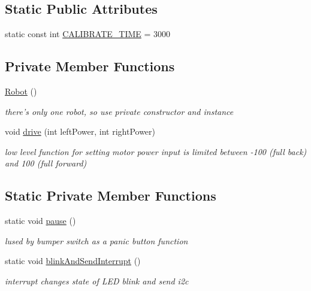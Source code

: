 \subsection*{Static Public Attributes}
\begin{DoxyCompactItemize}
\item 
static const int \hyperlink{classRobot_ac40abfa06749a68604af90c00e2a3fee}{C\-A\-L\-I\-B\-R\-A\-T\-E\-\_\-\-T\-I\-M\-E} = 3000
\end{DoxyCompactItemize}
\subsection*{Private Member Functions}
\begin{DoxyCompactItemize}
\item 
\hyperlink{classRobot_a4fc7c70ae20623f05e06f2ecb388b6c4}{Robot} ()
\begin{DoxyCompactList}\small\item\em there's only one robot, so use private constructor and instance \end{DoxyCompactList}\item 
void \hyperlink{classRobot_aad8723ec56e9fc8ca17da5ef79de37d6}{drive} (int left\-Power, int right\-Power)
\begin{DoxyCompactList}\small\item\em low level function for setting motor power input is limited between -\/100 (full back) and 100 (full forward) \end{DoxyCompactList}\end{DoxyCompactItemize}
\subsection*{Static Private Member Functions}
\begin{DoxyCompactItemize}
\item 
static void \hyperlink{classRobot_a9908dfe5a06008e6203edca94d30327a}{pause} ()
\begin{DoxyCompactList}\small\item\em lused by bumper switch as a panic button function \end{DoxyCompactList}\item 
static void \hyperlink{classRobot_afb5418d31b61a64e0930fd1fb495c8c9}{blink\-And\-Send\-Interrupt} ()
\begin{DoxyCompactList}\small\item\em interrupt changes state of L\-E\-D blink and send i2c \end{DoxyCompactList}\end{DoxyCompactItemize}
